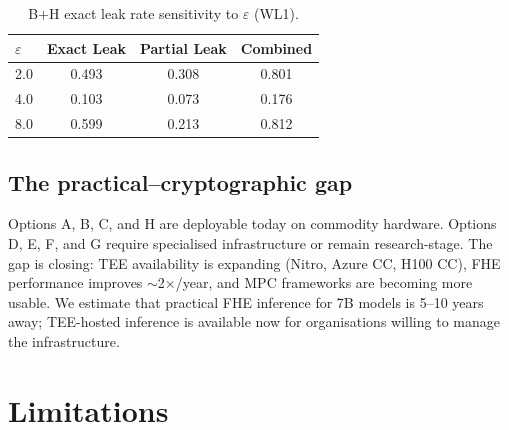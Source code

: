 \documentclass[11pt,a4paper]{article}
\begin{document}
\begin{table}[h]
\centering
\small
\caption{B+H exact leak rate sensitivity to $\varepsilon$ (WL1).}
\label{tab:epsilon}
\begin{tabular}{lccc}
\toprule
$\varepsilon$ & Exact Leak & Partial Leak & Combined \\
\midrule
2.0 & 0.493 & 0.308 & 0.801 \\
4.0 & 0.103 & 0.073 & 0.176 \\
8.0 & 0.599 & 0.213 & 0.812 \\
\bottomrule
\end{tabular}
\end{table}

\subsection{The practical--cryptographic gap}

Options A, B, C, and H are deployable today on commodity
hardware.  Options D, E, F, and G require specialised
infrastructure or remain research-stage.  The gap is closing:
TEE availability is expanding (Nitro, Azure CC, H100 CC), FHE
performance improves $\sim$2$\times$/year, and MPC frameworks
are becoming more usable.  We estimate that practical FHE
inference for 7B models is 5--10 years away; TEE-hosted
inference is available now for organisations willing to manage
the infrastructure.

\section{Limitations}
\label{sec:limits}
\end{document}
